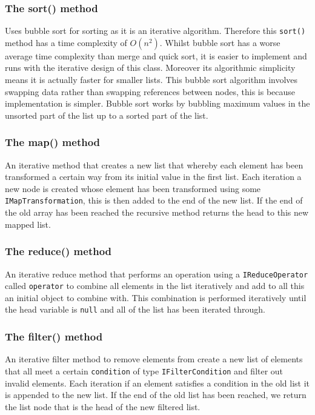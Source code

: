 \documentclass{article}
\begin{document}
\subsubsection{The sort() method}
Uses bubble sort for sorting as it is an iterative algorithm. Therefore this \verb+sort()+ method has a time complexity of $O(n^2)$. Whilst bubble sort has a worse average time complexity than merge and quick sort, it is easier to implement and runs with the iterative design of this class. Moreover its algorithmic simplicity means it is actually faster for smaller lists. This bubble sort algorithm involves swapping data rather than swapping references between nodes, this is because implementation is simpler. Bubble sort works by bubbling maximum values in the unsorted part of the list up to a sorted part of the list.

\subsubsection{The map() method}
An iterative method that creates a new list that whereby each element has been transformed a certain way from its initial value in the first list. Each iteration a new node is created whose element has been transformed using some \verb+IMapTransformation+, this is then added to the end of the new list. If the end of the old array has been reached the recursive method returns the head to this new mapped list.

\subsubsection{The reduce() method}
An iterative reduce method that performs an operation using a \verb+IReduceOperator+ called \verb+operator+ to combine all elements in the list iteratively and add to all this an initial object to combine with. This combination is performed iteratively until the head variable is \verb+null+ and all of the list has been iterated through.

\subsubsection{The filter() method}
An iterative filter method to remove elements from create a new list of elements that all meet a certain \verb+condition+ of type \verb+IFilterCondition+ and filter out invalid elements. Each iteration if an element satisfies a condition in the old list it is appended to the new list. If the end of the old list has been reached, we return the list node that is the head of the new filtered list.
\end{document}

